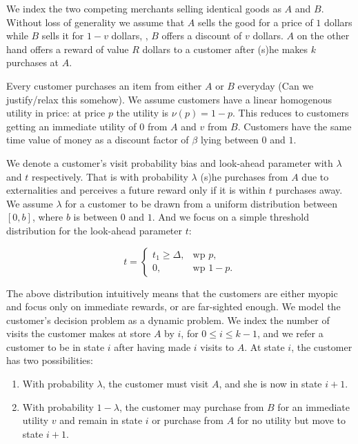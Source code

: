 We index the two competing merchants selling identical goods as $A$ and $B$.
Without loss of generality we assume that $A$ sells the good for a price of $1$ dollars while $B$ sells it for $1-v$ dollars, \ie, $B$ offers a discount of $v$ dollars. 
$A$ on the other hand offers a reward of value $R$ dollars to a customer after (s)he makes $k$ purchases at $A$. 

Every customer purchases an item from either $A$ or $B$ everyday {\arpit (Can we justify/relax this somehow)}.
We assume customers have a linear homogenous utility in price: at price $p$ the utility is $\nu(p) = 1-p$. 
This reduces to customers getting an immediate utility of $0$ from $A$ and $v$ from $B$.
Customers have the same time value of money as a discount factor of $\beta$ lying between $0$ and $1$.

We denote a customer's visit probability bias and look-ahead parameter with $\lambda$ and $t$ respectively. 
That is with probability $\lambda$ (s)he purchases from $A$ due to externalities and perceives a future reward only if it is within $t$ purchases away. 
We assume $\lambda$ for a customer to be drawn from a uniform distribution between $[0,b]$, where $b$ is between $0$ and $1$.
And we focus on a simple threshold distribution for the look-ahead parameter $t$: 

\begin{equation*}
  t=\begin{cases}
    t_1\geq \Delta, & \text{wp } p,\\
    0, & \text{wp } 1-p.
  \end{cases}
\end{equation*}

The above distribution intuitively means that the customers are either myopic and focus only on immediate rewards, or are far-sighted enough.
We model the customer's decision problem as a dynamic problem. We index the number of visits the customer makes at store $A$ by $i$, for $0 \leq i \leq k-1$, and we refer a customer to be in state $i$ after having made $i$ visits to $A$. At state $i$, the customer has two possibilities:
\begin{enumerate}
\item
With probability $\lambda$, the customer must visit $A$, and she is now in state $i+1$.
\item
With probability $1-\lambda$, the customer may purchase from $B$ for an immediate utility $v$ and remain in state $i$ or purchase from $A$ for no utility but move to state $i+1$.
\end{enumerate}

